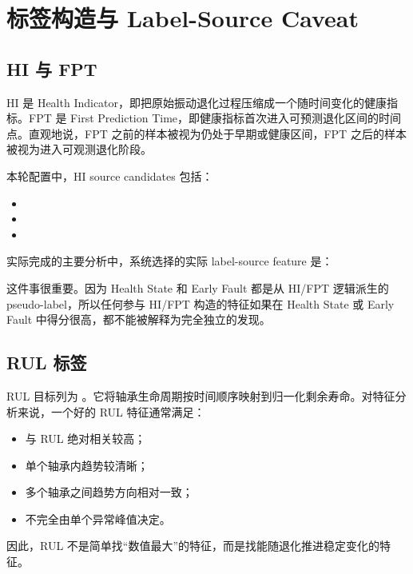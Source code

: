 \section{标签构造与 Label-Source Caveat}

\subsection{HI 与 FPT}

HI 是 Health Indicator，即把原始振动退化过程压缩成一个随时间变化的健康指标。FPT 是 First Prediction Time，即健康指标首次进入可预测退化区间的时间点。直观地说，FPT 之前的样本被视为仍处于早期或健康区间，FPT 之后的样本被视为进入可观测退化阶段。

本轮配置中，HI source candidates 包括：

\begin{itemize}[leftmargin=2em]
  \item {}
  \item {}
  \item {}
\end{itemize}

实际完成的主要分析中，系统选择的实际 label-source feature 是：

\begin{center}
\end{center}

这件事很重要。因为 Health State 和 Early Fault 都是从 HI/FPT 逻辑派生的 pseudo-label，所以任何参与 HI/FPT 构造的特征如果在 Health State 或 Early Fault 中得分很高，都不能被解释为完全独立的发现。

\subsection{RUL 标签}

RUL 目标列为 。它将轴承生命周期按时间顺序映射到归一化剩余寿命。对特征分析来说，一个好的 RUL 特征通常满足：

\begin{itemize}[leftmargin=2em]
  \item 与 RUL 绝对相关较高；
  \item 单个轴承内趋势较清晰；
  \item 多个轴承之间趋势方向相对一致；
  \item 不完全由单个异常峰值决定。
\end{itemize}

因此，RUL 不是简单找“数值最大”的特征，而是找能随退化推进稳定变化的特征。

